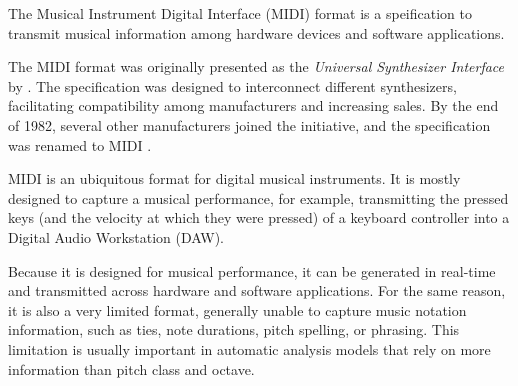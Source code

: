 


The Musical Instrument Digital Interface (MIDI) format is a
speification to transmit musical information among hardware
devices and software applications.

The MIDI format was originally presented as the
\emph{Universal Synthesizer Interface} by
\textcite{smith1981usi}. The specification was
designed to interconnect different synthesizers,
facilitating compatibility among manufacturers and
increasing sales. By the end of 1982, several other
manufacturers joined the initiative, and the specification
was renamed to MIDI \parencite{moog1986midi}.


MIDI is an ubiquitous format for digital musical instruments. It is mostly designed to capture a musical performance, for example, transmitting the pressed keys (and the velocity at which they were pressed) of a keyboard controller into a Digital Audio Workstation (DAW).

Because it is designed for musical performance, it can be generated in real-time and transmitted across hardware and software applications. For the same reason, it is also a very limited format, generally unable to capture music notation information, such as ties, note durations, pitch spelling, or phrasing. This limitation is usually important in automatic analysis models that rely on more information than pitch class and octave.


